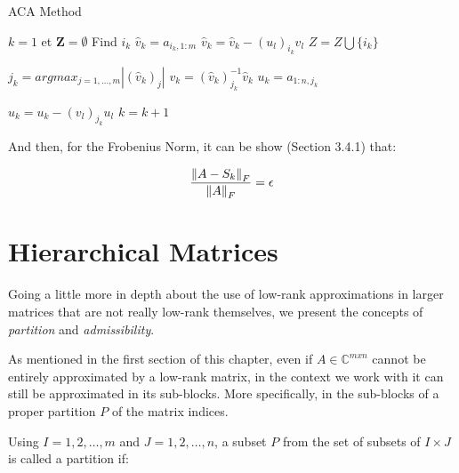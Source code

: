 \begin{algorithm}
    \caption{ACA Method}\label{alg:aca_method}
    \begin{algorithmic}[1]
        \State $k=1$ et $\mathbf{Z} = \emptyset $
        \Repeat
        \State Find $i_{k}$
        \State $\hat{v}_{k} = a_{i_{k},1:m} $
        \State $\hat{v}_{k} = \hat{v}_{k} - (u_{l})_{i_{k}}v_{l} $
        \EndFor
        \State $Z = Z \bigcup \{ i_{k} \} $

        \State $j_{k} = argmax_{j=1, \dots, m}|(\hat{v}_{k})_{j}|$
        \State $v_{k} = (\hat{v}_{k})^{-1}_{j_{k}} \hat{v}_{k}$
        \State $u_{k}=a_{1:n,j_{k}}$

        \State $u_{k}=u_{k} - (v_{l})_{j_{k}}u_{l}$
        \EndFor
        \State $k=k+1$

        \EndIf



    \end{algorithmic}
\end{algorithm}

And then, for the Frobenius Norm, it can be show \cite{trefethen1998numerical}(Section 3.4.1) that:

\begin{equation}\label{eq:stop_ACA}
    \frac{\left\lVert A - S_{k}\right\rVert_{F}}{\left\lVert A\right\rVert_{F}} = \epsilon
\end{equation}

\section{Hierarchical Matrices}

Going a little more in depth about the use of low-rank approximations in larger matrices that are not really low-rank themselves, we present the concepts of \textit{partition} and \textit{admissibility}.

As mentioned in the first section of this chapter, even if  $A \in \mathbb{C}^{m x n} $ cannot be entirely approximated by a low-rank matrix, in the context we work with it can still be approximated in its sub-blocks. More specifically, in the sub-blocks of a proper partition $P$ of the matrix indices.

Using $I = {1,2, \dots, m}$ and $J={1,2, \dots, n}$, a subset $P$ from the set of subsets of $I \times J$ is called a partition if:

